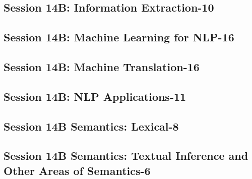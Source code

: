 \subsection{\large Session 14B: Information Extraction-10}
\label{parallel-session-14B-trackA}
\TrackALoc\hfill\sessionchair{}{}
\clearpage
\subsection{\large Session 14B: Machine Learning for NLP-16}
\label{parallel-session-14B-trackB}
\TrackBLoc\hfill\sessionchair{}{}
\clearpage
\subsection{\large Session 14B: Machine Translation-16}
\label{parallel-session-14B-trackC}
\TrackCLoc\hfill\sessionchair{}{}
\clearpage
\subsection{\large Session 14B: NLP Applications-11}
\label{parallel-session-14B-trackD}
\TrackDLoc\hfill\sessionchair{}{}
\clearpage
\subsection{\large Session 14B Semantics: Lexical-8}
\label{parallel-session-14B-trackE}
\TrackELoc\hfill\sessionchair{}{}
\clearpage
\subsection{\large Session 14B Semantics: Textual Inference and Other Areas of Semantics-6}
\label{parallel-session-14B-trackF}
\TrackFLoc\hfill\sessionchair{}{}
\clearpage
